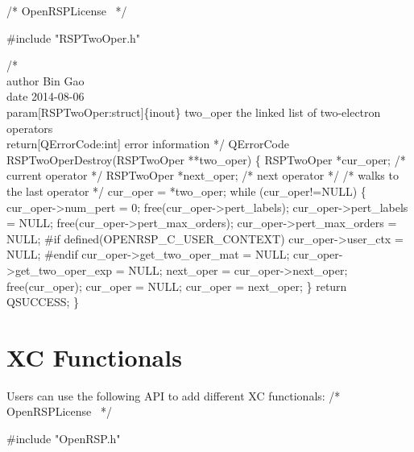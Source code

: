 \nwendcode{}\endmoddef
/*
  \LA{}OpenRSPLicense~{\nwtagstyle{}}\RA{}
*/

#include "RSPTwoOper.h"

/*%
    \\author Bin Gao
    \\date 2014-08-06
    \\param[RSPTwoOper:struct]\{inout\} two_oper the linked list of two-electron operators
    \\return[QErrorCode:int] error information
*/
QErrorCode RSPTwoOperDestroy(RSPTwoOper **two_oper)
\{
    RSPTwoOper *cur_oper;   /* current operator */
    RSPTwoOper *next_oper;  /* next operator */
    /* walks to the last operator */
    cur_oper = *two_oper;
    while (cur_oper!=NULL) \{
        cur_oper->num_pert = 0;
        free(cur_oper->pert_labels);
        cur_oper->pert_labels = NULL;
        free(cur_oper->pert_max_orders);
        cur_oper->pert_max_orders = NULL;
#if defined(OPENRSP_C_USER_CONTEXT)
        cur_oper->user_ctx = NULL;
#endif
        cur_oper->get_two_oper_mat = NULL;
        cur_oper->get_two_oper_exp = NULL;
        next_oper = cur_oper->next_oper;
        free(cur_oper);
        cur_oper = NULL;
        cur_oper = next_oper;
    \}
    return QSUCCESS;
\}

\nwendcode{}\section{XC Functionals}
\label{section-OpenRSP-XCFun}

Users can use the following API to add different XC functionals:
\nwenddocs{}\endmoddef
/*
  \LA{}OpenRSPLicense~{\nwtagstyle{}}\RA{}
*/

#include "OpenRSP.h"

